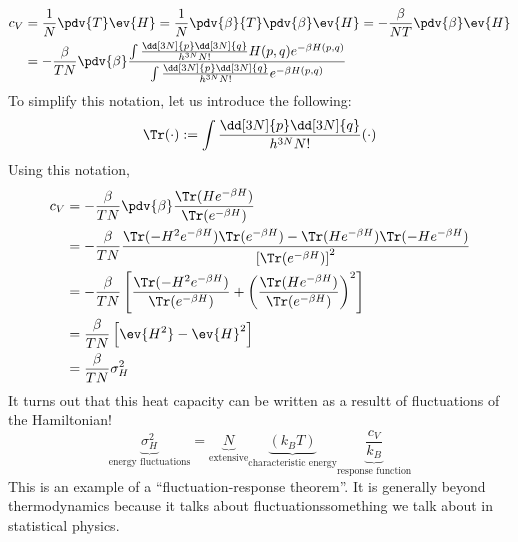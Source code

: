 \documentclass[a4paper,twoside,master.tex]{subfiles}
\begin{document}
\begin{align}
    c_V &= \frac{1}{N} \pdv{T} \ev{H} = \frac{1}{N} \pdv{\beta}{T} \pdv{\beta} \ev{H} = - \frac{\beta}{NT} \pdv{\beta} \ev{H} \\
    &= - \frac{\beta}{TN} \pdv{\beta} \frac{\int \frac{\dd[3N]{p} \dd[3N]{q}}{h^{3N} N!} H(p,q) e^{- \beta H(p,q)}}{\int \frac{\dd[3N]{p} \dd[3N]{q}}{h^{3N} N!} e^{- \beta H(p,q)}}
\end{align}
To simplify this notation, let us introduce the following:
\begin{equation}
    \Tr( \cdot ) := \int \frac{\dd[3N]{p} \dd[3N]{q}}{h^{3N} N!} ( \cdot )
\end{equation}
Using this notation,
\begin{align}
    c_V &= - \frac{\beta}{TN} \pdv{\beta} \frac{\Tr(H e^{- \beta H})}{\Tr(e^{- \beta H})} \\
    &= - \frac{\beta}{TN} \frac{\Tr(-H^2 e^{- \beta H}) \Tr(e^{- \beta H}) - \Tr(H e^{- \beta H}) \Tr(-H e^{- \beta H})}{\left[ \Tr(e^{- \beta H}) \right]^2} \\
    &= - \frac{\beta}{TN} \left[ \frac{\Tr(-H^2 e^{- \beta H})}{\Tr(e^{- \beta H})} + \left( \frac{\Tr(H e^{- \beta H})}{\Tr(e^{- \beta H})} \right)^2 \right] \\
    &= \frac{\beta}{TN} \left[ \ev{H^2} - \ev{H}^2 \right] \\
    &= \frac{\beta}{TN} \sigma^2_H
\end{align}
It turns out that this heat capacity can be written as a resultt of fluctuations of the Hamiltonian!
\begin{equation}
    \underbrace{\sigma^2_H}_{\text{energy fluctuations}} = \underbrace{N}_{\text{extensive}} \underbrace{(k_B T)}_{\text{characteristic energy}} \underbrace{\frac{c_V}{k_B}}_{\text{response function}} 
\end{equation}
This is an example of a ``fluctuation-response theorem''. It is generally beyond thermodynamics because it talks about fluctuations\textemdash something we talk about in statistical physics.
\end{document}
